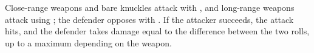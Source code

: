 
Close-range weapons and bare knuckles attack with \stat{\statPhysical}, and long-range weapons attack using \stat{\statMental}; the defender opposes with \stat{\statSkill}. If the attacker succeeds, the attack hits, and the defender takes damage equal to the difference between the two rolls, up to a maximum depending on the weapon.
